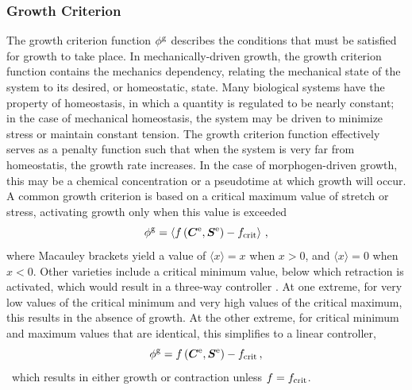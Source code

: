 \documentclass[10pt,letterpaper,oneside]{report}
\newcommand{\ten}[1]{\mbox{\boldmath $#1$}{}}
\newcommand{\scas}[1]{\mbox{{\scriptsize{${\rm{#1}}$}}}{}}
\begin{document}
\subsubsection{Growth Criterion}
\label{subsec:crit}
The growth criterion function $\phi^{\scas{g}}$ describes the conditions that must be satisfied for growth to take place.  
In mechanically-driven growth, the growth criterion function contains the mechanics dependency, relating the mechanical state of the system to its desired, or homeostatic, state.  Many biological systems have the property of homeostasis, in which a quantity is regulated to be nearly constant; in the case of mechanical homeostasis, the system may be driven to minimize stress or maintain constant tension.  The growth criterion function effectively serves as a penalty function such that when the system is very far from homeostatis, the growth rate increases.  
In the case of morphogen-driven growth, this may be a chemical concentration or a pseudotime at which growth will occur.  
A common growth criterion is based on a critical maximum value of stretch or stress, activating growth only when this value is exceeded
\begin{equation}
\phi^{\scas{g}} = \left\langle f \left( \ten{C}^{\scas{e}}, \ten{S}^{\scas{e}} \right) - f_{\scas{crit}} \right\rangle \, ,
\end{equation}
where Macauley brackets yield a value of $ \langle x \rangle = x $ when $ x > 0$, and $ \langle x \rangle = 0 $ when $ x < 0$.  
Other varieties include a critical minimum value, below which retraction is activated, which would result in a three-way controller \cite{Dennerll1989}.  At one extreme, for very low values of the critical minimum and very high values of the critical maximum, this results in the absence of growth.  At the other extreme, for critical minimum and maximum values that are identical, this simplifies to a linear controller, 
\begin{equation}
\phi^{\scas{g}} = f \left( \ten{C}^{\scas{e}}, \ten{S}^{\scas{e}} \right) - f_{\scas{crit}} \, ,
\end{equation}\
which results in either growth or contraction unless $f = f_{\scas{crit}}$.
\end{document}
